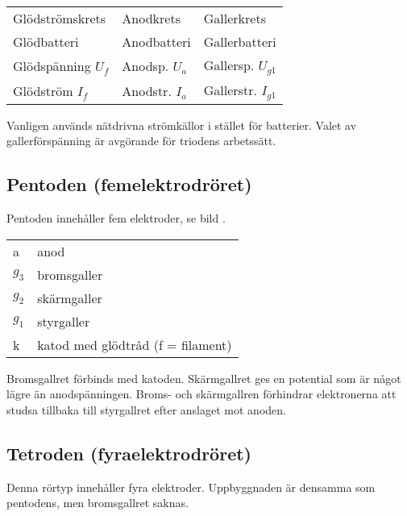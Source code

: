 \begin{center}
\begin{tabular}{lll}
Glödströmskrets      & Anodkrets        &  Gallerkrets \\
Glödbatteri          & Anodbatteri      &  Gallerbatteri \\
Glödspänning \(U_f\) & Anodsp. \(U_a\)  &  Gallersp. \(U_{g1}\) \\
Glödström \(I_f\)    & Anodstr. \(I_a\) &  Gallerstr. \(I_{g1}\) \\
\end{tabular}
\end{center}

\noindent
Vanligen används nätdrivna strömkällor i stället för batterier.
Valet av gallerförspänning är avgörande för triodens arbetssätt.

\subsection{Pentoden (femelektrodröret)}

Pentoden innehåller fem elektroder, se bild .

\begin{center}
\begin{tabular}{ll}
  a       & anod \\
  \(g_3\) & bromsgaller \\
  \(g_2\) & skärmgaller \\
  \(g_1\) & styrgaller \\
  k      & katod med glödtråd (f = filament) \\
\end{tabular}
\end{center}

Bromsgallret förbinds med katoden. Skärmgallret ges en potential som är något
lägre än anodspänningen.
Broms- och skärmgallren förhindrar elektronerna att studsa tillbaka till
styrgallret efter anslaget mot anoden.


\subsection{Tetroden (fyraelektrodröret)}

Denna rörtyp innehåller fyra elektroder. Uppbyggnaden är densamma som pentodens,
men bromsgallret saknas.


